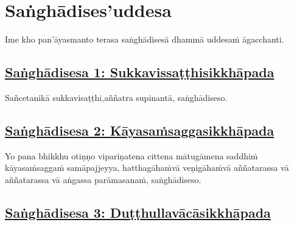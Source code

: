 
\setsecheadstyle{\sectionFmt}
\section{Saṅghādises'uddesa}
\label{sd}

\begin{intro}
	Ime kho pan'āyasmanto terasa saṅghādisesā dhammā uddesaṁ āgacchanti.
\end{intro}

\subsection*{\hyperref[comm1]{Saṅghādisesa 1: Sukkavissaṭṭhisikkhāpada}}

\label{sd1}

Sañcetanikā sukkavisaṭṭhi,\makeatletter\hyperlink{endnote38-appendix}\makeatother \thinspace aññatra supinantā, saṅghādiseso.



\subsection*{\hyperref[comm2]{Saṅghādisesa 2: Kāyasaṁsaggasikkhāpada}}
\label{sd2}

Yo pana bhikkhu otiṇṇo vipariṇatena cittena mātugāmena saddhiṁ kāyasaṁsaggaṁ samāpajjeyya, hatthagāhaṁ\makeatletter\hyperlink{endnote39-appendix}\makeatother \thinspace vā veṇigāhaṁ\makeatletter\hyperlink{endnote40-appendix}\makeatother \thinspace vā aññatarassa vā aññatarassa vā aṅgassa parāmasanaṁ, saṅghādiseso.



\subsection*{\hyperref[comm3]{Saṅghādisesa 3: Duṭṭhullavācāsikkhāpada}}
\label{sd3}

